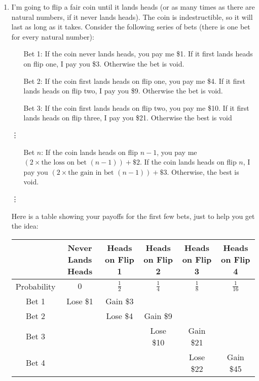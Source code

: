 \documentclass[12pt,a4paper]{article}
\begin{document}
\begin{enumerate}
\item I'm going to flip a fair coin until it lands heads (or as many times as there are natural numbers, if it never lands heads). The coin is indestructible, so it will last as long as it takes. Consider the following series of bets (there is one bet for every natural number):
\begin{itemize}
\item[Bet 1:] If the coin never lands heads, you pay me \$1. If it first lands heads on flip one, I pay you \$3. Otherwise the bet is void.
\item[Bet 2:] If the coin first lands heads on flip one, you pay me \$4. If it first lands heads on flip two, I pay you \$9. Otherwise the bet is void.
\item[Bet 3:] If the coin first lands heads on flip two, you pay me \$10. If it first lands heads on flip three, I pay you \$21. Otherwise the best is void
\end{itemize}
\hspace{70mm}\vdots
\begin{itemize}
\item[Bet $n$:] If the coin lands heads on flip $n-1$, you pay me $(2\times \text{the loss on bet }(n-1))+\$2$. If the coin lands heads on flip $n$, I pay you $(2\times\text{the gain in bet }(n-1))+\$3$. Otherwise, the best is void.
\end{itemize}
\hspace{70mm}\vdots
\vspace{5mm}

Here is a table showing your payoffs for the first few bets, just to help you get the idea:

\begin{adjustwidth}{-10mm}{}
\begin{tabular}{c|c|c|c|c|c}
& Never Lands Heads & Heads on Flip 1 & Heads on Flip 2 & Heads on Flip 3 & Heads on Flip 4\\ \hline
Probability & $0$ & $\frac{1}{2}$ & $\frac{1}{4}$ & $\frac{1}{8}$ & $\frac{1}{16}$\\ \hline
Bet 1 & Lose \$1 & Gain \$3 & & &\\ \hline
Bet 2 & & Lose \$4 & Gain \$9 & &\\ \hline
Bet 3 & & & Lose \$10 & Gain \$21 &\\ \hline
Bet 4 & & & & Lose \$22 & Gain \$45\\
\end{tabular}
\end{adjustwidth}


\end{enumerate}
\end{document}
